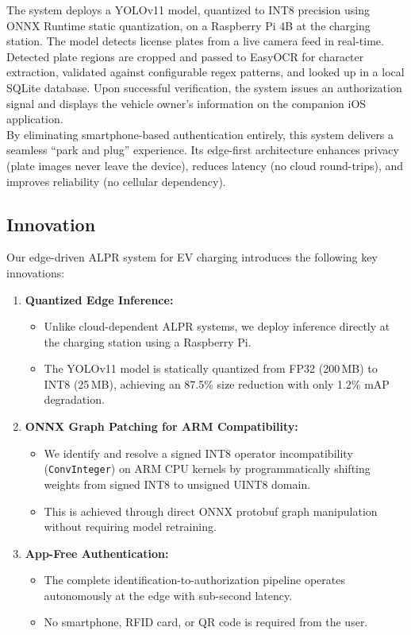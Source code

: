 \documentclass[11pt]{report}
\begin{document}
The system deploys a YOLOv11 model, quantized to INT8 precision using ONNX Runtime static quantization, on a Raspberry Pi 4B at the charging station. The model detects license plates from a live camera feed in real-time. Detected plate regions are cropped and passed to EasyOCR for character extraction, validated against configurable regex patterns, and looked up in a local SQLite database. Upon successful verification, the system issues an authorization signal and displays the vehicle owner's information on the companion iOS application. \\

By eliminating smartphone-based authentication entirely, this system delivers a seamless ``park and plug'' experience. Its edge-first architecture enhances privacy (plate images never leave the device), reduces latency (no cloud round-trips), and improves reliability (no cellular dependency).

\subsection{Innovation}
Our edge-driven ALPR system for EV charging introduces the following key innovations:
\begin{enumerate}
    \item \textbf{Quantized Edge Inference:}
    \begin{itemize}
        \item Unlike cloud-dependent ALPR systems, we deploy inference directly at the charging station using a Raspberry Pi.
        \item The YOLOv11 model is statically quantized from FP32 (200\,MB) to INT8 (25\,MB), achieving an 87.5\% size reduction with only 1.2\% mAP degradation.
    \end{itemize}

    \item \textbf{ONNX Graph Patching for ARM Compatibility:}
    \begin{itemize}
        \item We identify and resolve a signed INT8 operator incompatibility (\texttt{ConvInteger}) on ARM CPU kernels by programmatically shifting weights from signed INT8 to unsigned UINT8 domain.
        \item This is achieved through direct ONNX protobuf graph manipulation without requiring model retraining.
    \end{itemize}

    \item \textbf{App-Free Authentication:}
    \begin{itemize}
        \item The complete identification-to-authorization pipeline operates autonomously at the edge with sub-second latency.
        \item No smartphone, RFID card, or QR code is required from the user.
    \end{itemize}
\end{enumerate}
\end{document}
